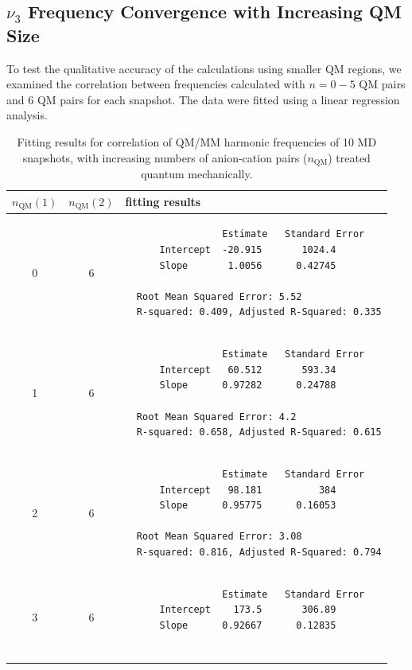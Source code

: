 \documentclass[%
  class = book,%
  crop = false,%
  float = true,%
  multi = true,%
  preview = false,%
]{standalone}
\begin{document}
\subsection{\texorpdfstring{\(\nu_{3}\)}{Asymmetric Stretch} Frequency Convergence with Increasing QM Size}
\label{paper_02:ssec:SI6}

To test the qualitative accuracy of the calculations using smaller QM regions, we examined the correlation between frequencies calculated with \(n = 0-5\) QM pairs and \num{6} QM pairs for each snapshot. The data were fitted using a linear regression analysis.

\begin{table}
  \centering
  \caption[Fit procedure results for DVR convergence]{Fitting results for correlation of QM/MM harmonic frequencies of \num{10} MD snapshots, with increasing numbers of anion-cation pairs (\(n_{\text{QM}}\)) treated quantum mechanically.}
  \label{paper_02:tab:S6}
  \footnotesize
  \begin{tabular}{ccl}
    \toprule
    \(n_{\text{QM}}(1)\) & \(n_{\text{QM}}(2)\) & fitting results \\
    \midrule
    0 & 6 &
            \begin{minipage}{4.5in}
\begin{verbatim}
                 Estimate   Standard Error
      Intercept  -20.915       1024.4
      Slope       1.0056      0.42745

  Root Mean Squared Error: 5.52
  R-squared: 0.409, Adjusted R-Squared: 0.335
\end{verbatim}
            \end{minipage} \\
    1 & 6 &
            \begin{minipage}{4.5in}
\begin{verbatim}
                 Estimate   Standard Error
      Intercept   60.512       593.34
      Slope      0.97282      0.24788

  Root Mean Squared Error: 4.2
  R-squared: 0.658, Adjusted R-Squared: 0.615
\end{verbatim}
            \end{minipage} \\
    2 & 6 &
            \begin{minipage}{4.5in}
\begin{verbatim}
                 Estimate   Standard Error
      Intercept   98.181          384
      Slope      0.95775      0.16053

  Root Mean Squared Error: 3.08
  R-squared: 0.816, Adjusted R-Squared: 0.794
\end{verbatim}
            \end{minipage} \\
    3 & 6 &
            \begin{minipage}{4.5in}
\begin{verbatim}
                 Estimate   Standard Error
      Intercept    173.5       306.89
      Slope      0.92667      0.12835


\end{verbatim}
\end{minipage}
\end{tabular}
\end{table}
\end{document}
